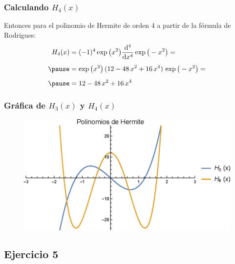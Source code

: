 \documentclass[12pt]{beamer}
\begin{document}
\begin{frame}
\frametitle{Calculando $H_{4} (x)$}
Entonces para el polinomio de Hermite de orden 4 a partir de la fórmula de Rodrigues:
\pause
\begin{eqnarray*}
\begin{aligned}
H_{4} (x) &= (-1)^{4} \exp\big( x^{2} \big) \dv[4]{x} \exp\big( - x^{2} \big) = \\[0.5em] \pause
&= \exp\big( x^{2} \big) \, (12 - 48 \, x^{2} + 16 \, x^{4}) \, \exp\big( - x^{2} \big) = \\[0.5em] \pause
&= 12 - 48 \, x^{2} + 16 \, x^{4}
\end{aligned}
\end{eqnarray*}
\end{frame}
\begin{frame}
\frametitle{Gráfica de $H_{3} (x)$ y $H_{4} (x)$}
\begin{figure}
  \centering
  \includegraphics[scale=0.95]{Imagenes/Plot_Hermite_H3_H4.eps}
\end{figure}
\end{frame}

\subsection{Ejercicio 5}
\end{document}
